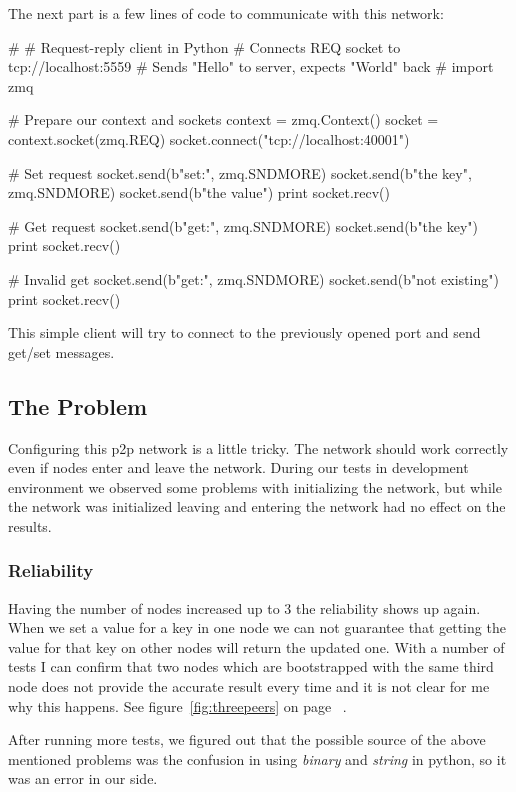 The next part is a few lines of code to communicate with this network:

\begin{python}
#
# Request-reply client in Python
# Connects REQ socket to tcp://localhost:5559
# Sends "Hello" to server, expects "World" back
#
import zmq

# Prepare our context and sockets
context = zmq.Context()
socket = context.socket(zmq.REQ)
socket.connect("tcp://localhost:40001")

# Set request
socket.send(b"set:", zmq.SNDMORE)
socket.send(b"the key", zmq.SNDMORE)
socket.send(b"the value")
print socket.recv()

# Get request
socket.send(b"get:", zmq.SNDMORE)
socket.send(b"the key")
print socket.recv()

# Invalid get
socket.send(b"get:", zmq.SNDMORE)
socket.send(b"not existing")
print socket.recv()
\end{python}

This simple client will try to connect to the previously opened port and send get/set messages.

\subsection{The Problem}
Configuring this p2p network is a little tricky. The network should work correctly even if nodes enter and leave the network. During our tests in development environment we observed some problems with initializing the network, but while the network was initialized leaving and entering the network had no effect on the results.

\subsubsection{Reliability}
Having the number of nodes increased up to 3 the reliability shows up again. When we set a value for a key in one node we can not guarantee that getting the value for that key on other nodes will return the updated one. With a number of tests I can confirm that two nodes which are bootstrapped with the same third node does not provide the accurate result every time and it is not clear for me why this happens. See figure~\ref{fig:threepeers} on page ~\pageref{fig:threepeers}.

After running more tests, we figured out that the possible source of the above mentioned problems was the confusion in using \textit{binary} and \textit{string} in python, so it was an error in our side.

